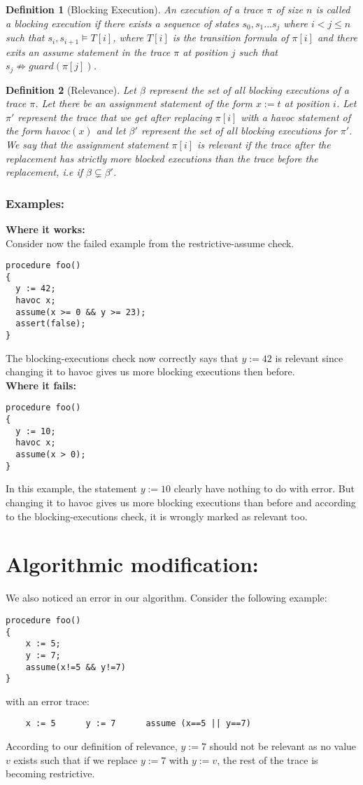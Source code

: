 \documentclass{article}
\newcommand{\limp}{\Rightarrow}
\newtheorem{mydef}{Definition}
\begin{document}
\begin{mydef}[Blocking Execution]\label{mydef:blockingexecution_definition}
An execution of a trace $\pi$ of size $n$ is called a blocking execution if there exists a sequence of states $s_0, s_1...s_j$ where $i<j \leq n$ such that $s_i, s_{i+1} \models T[i]$, where $T[i]$ is the transition formula of $\pi[i]$ and there exits an assume statement in the trace $\pi$ at position $j$ such that $s_{j} \not \limp guard(\pi[j])$.
\end{mydef}

\begin{mydef}[Relevance]\label{mydef:relevancy_definition}
Let $\beta$ represent the set of all blocking executions of a trace $\pi$. Let there be an assignment statement of the form $x:=t$ at position $i$. Let $\pi'$ represent the trace that we get after replacing $\pi[i]$ with a havoc statement of the form $havoc(x)$ and let $\beta'$ represent the set of all blocking executions for $\pi'$.\\
We say that the assignment statement $\pi[i]$ is relevant if the trace after the replacement has strictly more blocked executions than the trace before the replacement, i.e if $\beta \subsetneq \beta'$. 
\end{mydef}
\subsubsection{Examples:}
\textbf{Where it works:}\\
Consider now the failed example from the restrictive-assume check. 
\begin{lstlisting}
procedure foo()
{
  y := 42;
  havoc x;
  assume(x >= 0 && y >= 23);
  assert(false);
}
\end{lstlisting}
The blocking-executions check now correctly says that $y:=42$ is relevant since changing it to havoc gives us more blocking executions then before.\\
\textbf{Where it fails:}
\begin{lstlisting}
procedure foo()
{
  y := 10;
  havoc x;
  assume(x > 0);
}
\end{lstlisting}
In this example, the statement $y:=10$ clearly have nothing to do with error. But changing it to havoc gives us more blocking executions than before and according to the blocking-executions check, it is wrongly marked as relevant too. 

\newpage
\section{Algorithmic modification:}
We also noticed an error in our algorithm. Consider the following example:
\begin{lstlisting}
procedure foo()
{
	x := 5;
	y := 7;
	assume(x!=5 && y!=7)
}
\end{lstlisting}
with an error trace:
\begin{lstlisting}
	x := 5		y := 7		assume (x==5 || y==7) 
\end{lstlisting}
According to our definition of relevance, $y:=7$ should not be relevant as no value $v$ exists such that if we replace $y:=7$ with $y:=v$, the rest of the trace is becoming restrictive. 
\end{document}
